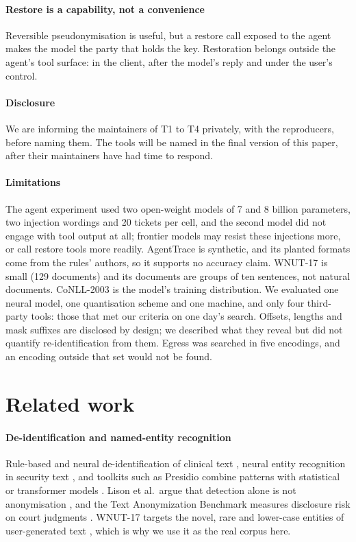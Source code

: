\documentclass[conference]{IEEEtran}
\begin{document}
\paragraph{Restore is a capability, not a convenience} Reversible pseudonymisation is useful, but a restore call exposed to the agent makes the model the party that holds the key. Restoration belongs outside the agent's tool surface: in the client, after the model's reply and under the user's control.

\paragraph{Disclosure} We are informing the maintainers of T1 to T4 privately, with the reproducers, before naming them. The tools will be named in the final version of this paper, after their maintainers have had time to respond.

\paragraph{Limitations} The agent experiment used two open-weight models of 7 and 8 billion parameters, two injection wordings and 20 tickets per cell, and the second model did not engage with tool output at all; frontier models may resist these injections more, or call restore tools more readily. AgentTrace is synthetic, and its planted formats come from the rules' authors, so it supports no accuracy claim. WNUT-17 is small (129 documents) and its documents are groups of ten sentences, not natural documents. CoNLL-2003 is the model's training distribution. We evaluated one neural model, one quantisation scheme and one machine, and only four third-party tools: those that met our criteria on one day's search. Offsets, lengths and mask suffixes are disclosed by design; we described what they reveal but did not quantify re-identification from them. Egress was searched in five encodings, and an encoding outside that set would not be found.

\section{Related work}\label{sec:related}

\paragraph{De-identification and named-entity recognition} Rule-based and neural de-identification of clinical text \cite{norgeot2020philter,dernoncourt2017deid}, neural entity recognition in security text \cite{simran2020cybersecner}, and toolkits such as Presidio \cite{presidio,presidioresearch} combine patterns with statistical or transformer models \cite{devlin2019bert,sanh2019distilbert,zaratiana2024gliner}. Lison et al.\ argue that detection alone is not anonymisation \cite{lison2021anonymisation}, and the Text Anonymization Benchmark measures disclosure risk on court judgments \cite{pilan2022tab}. WNUT-17 targets the novel, rare and lower-case entities of user-generated text \cite{derczynski2017wnut}, which is why we use it as the real corpus here.
\end{document}
